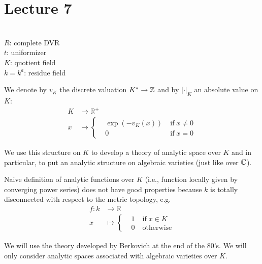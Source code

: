 \section{Lecture 7}


\begin{notation}
\hfill\\
$R$: complete DVR\\
$t$: uniformizer\\
$K$: quotient field\\
$k=k^{a}$: residue field
\end{notation}

We denote by $v_{K}$ the discrete valuation $K^{*}\rightarrow\mathbb{Z}$ and by $|\cdot|_{K}$ an absolute value on $K$:
\begin{align*}
K&\rightarrow\mathbb{R}^{+}\\
x&\mapsto
  \left\{
      \begin{aligned}
          &\exp(-v_{K}(x)) \; &\text{if} \; x\neq 0\\
          &0 \; &\text{if} \; x=0
      \end{aligned}
  \right.
\end{align*}

We use this structure on $K$ to develop a theory of analytic space over $K$ and in particular, to put an analytic structure
on algebraic varieties (just like over $\mathbb{C}$).

Naive definition of analytic functions over $K$ (i.e., function locally given by converging power series) does not have
good properties because $k$ is totally disconnected with respect to the metric topology, e.g.
\begin{align*}
f:k&\rightarrow\mathbb{R}\\
x&\mapsto
  \left\{
      \begin{aligned}
          &1 \; &\text{if} \; x\in K\\
          &0 \; &\text{otherwise}
      \end{aligned}
  \right.
\end{align*}

We will use the theory developed by Berkovich at the end of the 80's.
We will only consider analytic spaces associated with algebraic varieties over $K$.


